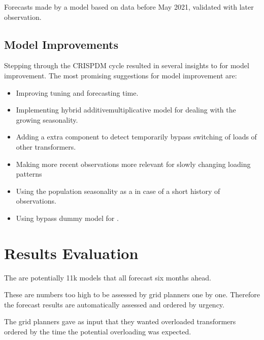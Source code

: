 \documentclass[letterpaper,10pt,english]{sphinxmanual}
\begin{document}
Forecasts made by a model based on data before May 2021, validated with later observation.


\subsection{Model Improvements}
\label{\detokenize{evaluation:model-improvements}}
Stepping through the CRISP\sphinxhyphen{}DM cycle resulted in several insights to for model improvement.
The most promising suggestions for model improvement are:
\begin{itemize}
\item {} 
Improving tuning and forecasting time.

\item {} 
Implementing hybrid additive\sphinxhyphen{}multiplicative model for dealing with the growing seasonality.

\item {} 
Adding a extra component to detect temporarily bypass switching of loads of other transformers.

\item {} 
Making more recent observations more relevant for slowly changing loading patterns

\item {} 
Using the population seasonality as a  in case of a short history of observations.

\item {} 
Using by\sphinxhyphen{}pass dummy model for .

\end{itemize}


\section{Results Evaluation}
\label{\detokenize{evaluation:results-evaluation}}
The are potentially 11k models that all forecast six months ahead.

These are numbers too high to be assessed by grid planners one by one.
Therefore the forecast results are automatically assessed and ordered by urgency.

The grid planners gave as input that they wanted overloaded transformers ordered by the time the potential overloading was expected.
\end{document}
